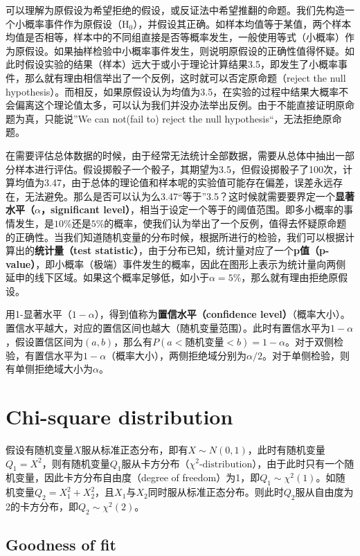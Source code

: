 \documentclass[11pt]{article}
\begin{document}
可以理解为原假设为希望拒绝的假设，或反证法中希望推翻的命题。我们先构造一个小概率事件作为原假设（$\text{H}_0$），并假设其正确。如样本均值等于某值，两个样本均值是否相等，样本中的不同组直接是否等概率发生，一般使用等式（小概率）作为原假设。如果抽样检验中小概率事件发生，则说明原假设的正确性值得怀疑。如此时假设实验的结果（样本）远大于或小于理论计算结果3.5，即发生了小概率事件，那么就有理由相信举出了一个反例，这时就可以否定原命题（reject the null hypothesis）。而相反，如果原假设认为均值为3.5，在实验的过程中结果大概率不会偏离这个理论值太多，可以认为我们并没办法举出反例。由于不能直接证明原命题为真，只能说”We can not(fail to) reject the null hypothesis“，无法拒绝原命题。

在需要评估总体数据的时候，由于经常无法统计全部数据，需要从总体中抽出一部分样本进行评估。假设掷骰子一个骰子，其期望为3.5，但假设掷骰子了100次，计算均值为3.47，由于总体的理论值和样本呢的实验值可能存在偏差，误差永远存在，无法避免。那么是否可以认为么3.47“等于”3.5？这时候就需要要界定一个\textbf{显著水平（$\alpha$，significant level）}，相当于设定一个等于的阈值范围。即多小概率的事情发生，是$10\%$还是$5\%$的概率，使我们认为举出了一个反例，值得去怀疑原命题的正确性。当我们知道随机变量的分布时候，根据所进行的检验，我们可以根据计算出的\textbf{统计量（test statistic）}，由于分布已知，统计量对应了一个\textbf{p值（p-value）}，即小概率（极端）事件发生的概率，因此在图形上表示为统计量向两侧延申的线下区域。如果这个概率足够低，如小于$\alpha=5\%$，那么就有理由拒绝原假设。

用1-显著水平（$1-\alpha$），得到值称为\textbf{置信水平（confidence level）}（概率大小）。置信水平越大，对应的置信区间也越大（随机变量范围）。此时有置信水平为$1-\alpha$，假设置信区间为$(a,b)$，那么有$P(a<\text{随机变量}<b)=1-\alpha$。对于双侧检验，有置信水平为$1-\alpha$（概率大小），两侧拒绝域分别为$\alpha/2$。对于单侧检验，则有单侧拒绝域大小为$\alpha$。

\section{Chi-square distribution}

假设有随机变量$X$服从标准正态分布，即有$X \sim N(0,1)$，此时有随机变量$Q_1=X^2$，则有随机变量$Q_1$服从卡方分布（$\chi^2\text{-distribution}$），由于此时只有一个随机变量，因此卡方分布自由度（degree of freedom）为1，即$Q_1 \sim \chi^2(1)$。如随机变量$Q_2 = X_1^2 + X_2^2$，且$X_1$与$X_2$同时服从标准正态分布。则此时$Q_2$服从自由度为2的卡方分布，即$Q_2 \sim \chi^2(2)$。


\subsection*{Goodness of fit}
\end{document}
